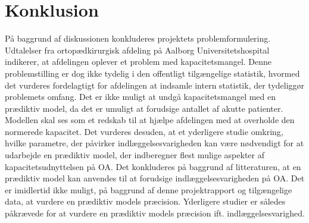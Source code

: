 \section{Konklusion}
På baggrund af diskussionen konkluderes projektets problemformulering. Udtalelser fra ortopædkirurgisk afdeling på Aalborg Universitetshospital indikerer, at afdelingen oplever et problem med kapacitetsmangel. Denne problemstilling er dog ikke tydelig i den offentligt tilgængelige statistik, hvormed det vurderes fordelagtigt for afdelingen at indsamle intern statistik, der tydeliggør problemets omfang. 
Det er ikke muligt at undgå kapacitetsmangel med en prædiktiv model, da det er umuligt at forudsige antallet af akutte patienter. Modellen skal ses som et redskab til at hjælpe afdelingen med at overholde den normerede kapacitet.
Det vurderes desuden, at et yderligere studie omkring, hvilke parametre, der påvirker indlæggelsesvarigheden kan være nødvendigt for at udarbejde en prædiktiv model, der indberegner flest mulige aspekter af kapacitetsudnyttelsen på OA.
Det konkluderes på baggrund af litteraturen, at en prædiktiv model kan anvendes til at forudsige indlæggelsesvarigheden på OA. Det er imidlertid ikke muligt, på baggrund af denne projektrapport og tilgængelige data, at vurdere en prædiktiv models præcision. Yderligere studier er således påkrævede for at vurdere en prædiktiv models præcision ift. indlæggelsesvarighed.